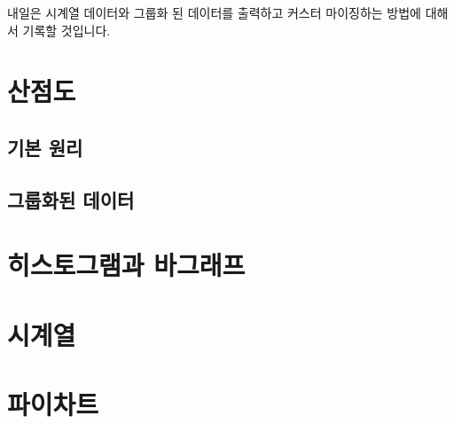 \documentclass[../tutorial.tex]{subfiles}
\begin{document}
내일은 시계열 데이터와 그룹화 된 데이터를 출력하고 커스터 마이징하는 방법에 대해서 기록할 것입니다.

\section{산점도}

\subsection{기본 원리}

\subsection{그룹화된 데이터}


\section{히스토그램과 바그래프}


\section{시계열}


\section{파이차트}



\end{document}
